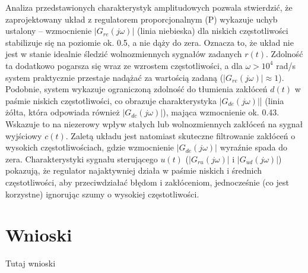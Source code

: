 \documentclass[12pt,a4paper]{article}
\begin{document}
		Analiza przedstawionych charakterystyk amplitudowych pozwala stwierdzić, że zaprojektowany układ z regulatorem proporcjonalnym (P) wykazuje uchyb ustalony – wzmocnienie $|G_{re}(j\omega)|$ (linia niebieska) dla niskich częstotliwości stabilizuje się na poziomie ok. 0.5, a nie dąży do zera. Oznacza to, że układ nie jest w stanie idealnie śledzić wolnozmiennych sygnałów zadanych $r(t)$. Zdolność ta dodatkowo pogarsza się wraz ze wzrostem częstotliwości, a dla $\omega > 10^4$ rad/s system praktycznie przestaje nadążać za wartością zadaną ($|G_{re}(j\omega)| \approx 1$). Podobnie, system wykazuje ograniczoną zdolność do tłumienia zakłóceń $d(t)$ w paśmie niskich częstotliwości, co obrazuje charakterystyka $|G_{de}(j\omega)|$| (linia żółta, która odpowiada również $|G_{dc}(j\omega)|$), mająca wzmocnienie ok. 0.43. Wskazuje to na niezerowy wpływ stałych lub wolnozmiennych zakłóceń na sygnał wyjściowy $c(t)$. Zaletą układu jest natomiast skuteczne filtrowanie zakłóceń o wysokich częstotliwościach, gdzie wzmocnienie $|G_{de}(j\omega)|$ wyraźnie spada do zera. Charakterystyki sygnału sterującego $u(t)$ ($|G_{ru}(j\omega)|$ i $|G_{ud}(j\omega)|$) pokazują, że regulator najaktywniej działa w paśmie niskich i średnich częstotliwości, aby przeciwdziałać błędom i zakłóceniom, jednocześnie (co jest korzystne) ignorując szumy o wysokiej częstotliwości.
			
	\section{Wnioski}
	Tutaj wnioski
	
\end{document}
